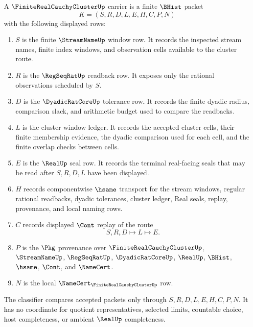 \begin{definition}
\label{def:finite-real-cauchy-cluster-carrier}
A $\FiniteRealCauchyClusterUp$ carrier is a finite $\BHist$ packet
$$
K=(S,R,D,L,E,H,C,P,N)
$$
with the following displayed rows:
\begin{enumerate}
\item $S$ is the finite $\StreamNameUp$ window row. It records the inspected stream names, finite index windows, and observation cells available to the cluster route.
\item $R$ is the $\RegSeqRatUp$ readback row. It exposes only the rational observations scheduled by $S$.
\item $D$ is the $\DyadicRatCoreUp$ tolerance row. It records the finite dyadic radius, comparison slack, and arithmetic budget used to compare the readbacks.
\item $L$ is the cluster-window ledger. It records the accepted cluster cells, their finite membership evidence, the dyadic comparison used for each cell, and the finite overlap checks between cells.
\item $E$ is the $\RealUp$ seal row. It records the terminal real-facing seals that may be read after $S,R,D,L$ have been displayed.
\item $H$ records componentwise $\hsame$ transport for the stream windows, regular rational readbacks, dyadic tolerances, cluster ledger, Real seals, replay, provenance, and local naming rows.
\item $C$ records displayed $\Cont$ replay of the route
$$
S,R,D \longmapsto L \longmapsto E .
$$
\item $P$ is the $\Pkg$ provenance over $\FiniteRealCauchyClusterUp$, $\StreamNameUp$, $\RegSeqRatUp$, $\DyadicRatCoreUp$, $\RealUp$, $\BHist$, $\hsame$, $\Cont$, and $\NameCert$.
\item $N$ is the local $\NameCert_{\FiniteRealCauchyClusterUp}$ row.
\end{enumerate}
The classifier compares accepted packets only through $S,R,D,L,E,H,C,P,N$. It has no coordinate for quotient representatives, selected limits, countable choice, host completeness, or ambient $\RealUp$ completeness.
\end{definition}

